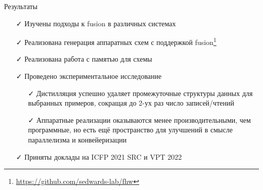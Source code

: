 \documentclass[xcolor=table,aspectratio=169]{beamer}
\begin{document}
\begin{frame}{Результаты}
    \begin{itemize}
        \vfill
        \item[\faCheck] Изучены подходы к fusion в различных системах
        \vfill
        \item[\faCheck] Реализована генерация аппаратных схем с поддержкой fusion\footnote{\url{https://github.com/sedwards-lab/fhw}}
        \vfill
        \item[\faCheck] Реализована работа с памятью для схемы
        \vfill
        \item[\faCheck] Проведено экспериментальное исследование
        \vfill
        \begin{itemize}
            \item[\faCheck] Дистилляция успешно удаляет промежуточные структуры данных для выбранных примеров, сокращая до 2-ух раз число записей/чтений
            \vfill
            \item[\faCheck] Аппаратные реализации оказываются менее производительными, чем программные, но есть ещё пространство для улучшений в смысле параллелизма и конвейеризации
            \vfill
        \end{itemize}
        \vfill
        \item[\faCheck] Приняты доклады на ICFP 2021 SRC и VPT 2022
        
    \end{itemize}
\end{frame}
\end{document}
